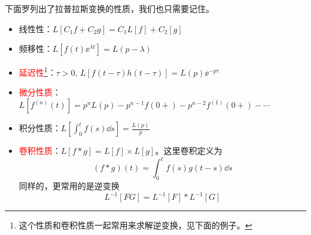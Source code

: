 下面罗列出了拉普拉斯变换的性质，我们也只需要记住。
\begin{itemize}
    \item 线性性：$L[C_1 f + C_2 g] = C_1 L[f] + C_2 [g]$
    \item 频移性：$L[f(t) \ee^{\lambda t}] = L(p - \lambda)$
    \item \textcolor{red}{延迟性}\footnote{这个性质和卷积性质一起常用来求解逆变换，见下面的例子。}：$\tau > 0,\, L[f(t - \tau) h(t - \tau)] = L(p) \ee^{- p \tau}$
    \item \textcolor{red}{微分性质}：$L[f^{\left(n\right)}(t)] = p^n L\left(p\right) - p^{n-1} f\left(0+\right) - p^{n-2} f^{\left(1\right)}\left(0+\right) - \cdots$
    \item 积分性质：$L[\int_{0}^{t} f(s) \dd{s}] = \frac{L(p)}{p}$
    \item \textcolor{red}{卷积性质}：$L[f * g] = L[f] \times L[g]$。这里卷积定义为
        \[(f * g)(t) = \int_{0}^{t} f(s) g(t-s) \dd{s}\]
        同样的，更常用的是逆变换
        \[L^{-1}[F G] = L^{-1}[F] * L^{-1}[G]\]
\end{itemize}

